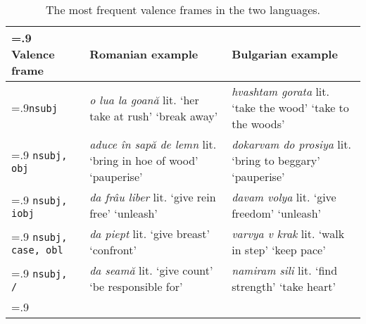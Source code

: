 \documentclass[output=paper,colorlinks,citecolor=brown]{langscibook}
\begin{document}
\begin{table}
\begin{tabularx}{\textwidth}{>{\hsize=.9\hsize}X >{\hsize=1.15\hsize}X >{\hsize=0.95\hsize}X}
\lsptoprule
Valence frame & Romanian example & Bulgarian example \\ \midrule
\texttt{nsubj} & \textit{o lua la goană} \newline lit. `her take at rush' \newline `break away' &  \textit{hvashtam gorata} \newline lit. `take the wood' \newline `take to the woods'  \\ \hline
\texttt{nsubj, obj} & \textit{aduce în sapă de lemn}  \newline lit. `bring in hoe of wood' \newline 
`pauperise' &  \textit{dokarvam do prosiya} \newline lit. `bring to beggary' \newline 
`pauperise'  \\ \hline
\texttt{nsubj, iobj} & \textit{da frâu liber}%
\newline lit. `give rein free' \newline `unleash' & \textit{davam volya} \newline  lit. `give freedom' \newline `unleash' \\\hline
\texttt{nsubj, case, obl} & \textit{da piept} \newline lit. `give breast' \newline `confront' & \textit{varvya v krak} \newline lit. `walk in step' \newline `keep pace' \\ \hline
\texttt{nsubj,  / } & \textit{da seamă} \newline lit. `give count' \newline `be responsible for' & \textit{namiram sili} \newline lit. `find strength' \newline `take heart'\\
\lspbottomrule
\end{tabularx}
\caption{The most frequent valence frames in the two languages.} \label{tab:valences}
\end{table}
\end{document}

